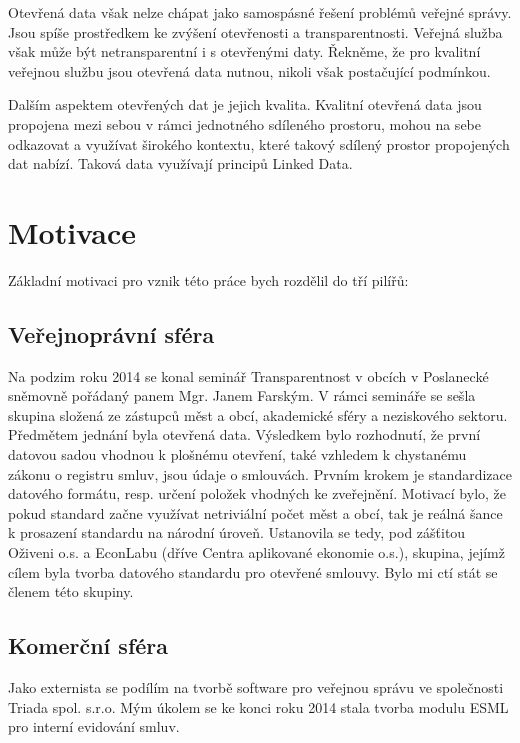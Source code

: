 Otevřená data však nelze chápat jako samospásné řešení problémů veřejné správy. Jsou spíše prostředkem ke zvýšení otevřenosti a transparentnosti. Veřejná služba však může být netransparentní i s otevřenými daty. Řekněme, že pro kvalitní veřejnou službu jsou otevřená data nutnou, nikoli však postačující podmínkou.

Dalším aspektem otevřených dat je jejich kvalita. Kvalitní otevřená data jsou propojena mezi sebou v rámci jednotného sdíleného prostoru, mohou na sebe odkazovat a využívat širokého kontextu, které takový sdílený prostor propojených dat nabízí. Taková data využívají principů Linked Data.\cite{opendatapsi, opendatagovernment, opendatacr, odgov_s}

\section{Motivace}

Základní motivaci pro vznik této práce bych rozdělil do tří pilířů:

\subsection*{Veřejnoprávní sféra}

Na podzim roku 2014 se konal seminář Transparentnost v obcích\cite{spt} v Poslanecké sněmovně pořádaný panem Mgr. Janem Farským. V rámci semináře se sešla skupina složená ze zástupců měst a obcí, akademické sféry a neziskového sektoru. Předmětem jednání byla otevřená data. Výsledkem bylo rozhodnutí, že první datovou sadou vhodnou k plošnému otevření, také vzhledem k chystanému zákonu o registru smluv, jsou údaje o smlouvách. Prvním krokem je standardizace datového formátu, resp. určení položek vhodných ke zveřejnění. Motivací bylo, že pokud standard začne využívat netriviální počet měst a obcí, tak je reálná šance k prosazení standardu na národní úroveň. Ustanovila se tedy, pod zášťitou Oživeni o.s. a EconLabu (dříve Centra aplikované ekonomie o.s.)\cite{econLab},  skupina, jejímž cílem byla tvorba datového standardu pro otevřené smlouvy. Bylo mi ctí stát se členem této skupiny.

\subsection*{Komerční sféra}

Jako externista se podílím na tvorbě software pro veřejnou správu ve společnosti Triada spol. s.r.o. Mým úkolem se ke konci roku 2014 stala tvorba modulu ESML pro interní evidování smluv.

